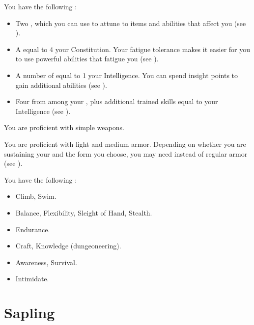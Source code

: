          You have the following :
        \begin{itemize}
            \item Two , which you can use to attune to items and abilities that affect you (see ).
            \item A  equal to 4 \add your Constitution.
                Your fatigue tolerance makes it easier for you to use powerful abilities that fatigue you (see ).
            \item A number of  equal to 1 \add your Intelligence.
                You can spend insight points to gain additional abilities (see ).
            \item Four  from among your , plus additional trained skills equal to your Intelligence (see ).
        \end{itemize}

        You are proficient with simple weapons.

        You are proficient with light and medium armor.
        Depending on whether you are sustaining your  and the form you choose, you may need  instead of regular armor (see ).

        You have the following :
        \begin{itemize}
            \item {} Climb, Swim.
            \item {} Balance, Flexibility, Sleight of Hand, Stealth.
            \item {} Endurance.
            \item {} Craft, Knowledge (dungeoneering).
            \item {} Awareness, Survival.
            \item {} Intimidate.
        \end{itemize}

\section{Sapling}


